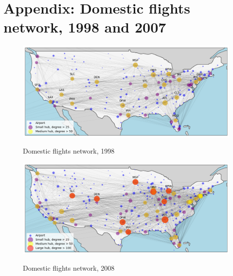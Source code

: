 \section{Appendix: Domestic flights network, 1998 and 2007}
\label{app:map_general}
\begin{figure}[H]
  \centering
  \caption{Domestic flights network, 1998}
    \includegraphics[width=1. \textwidth]{Exam/Figures/map_general_98}
    \vspace{-0.7cm}
  \label{fig:map_general_98}
\end{figure}

\begin{figure}[H]
  \centering
  \caption{Domestic flights network, 2008}
    \includegraphics[width=1. \textwidth]{Exam/Figures/map_general_08}
    \vspace{-0.7cm}
  \label{fig:map_general_08}
\end{figure}
